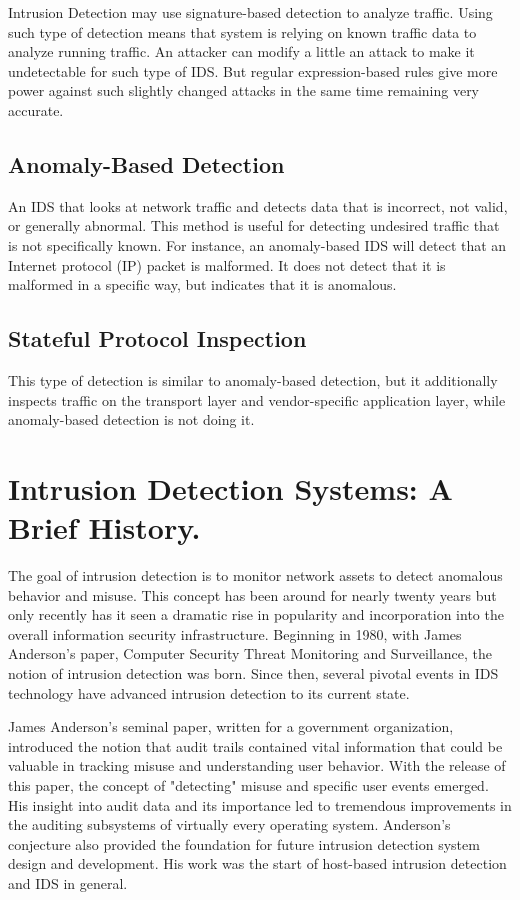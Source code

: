 \documentclass[thesis=M,english]{FITthesis}[2011/07/15]
\begin{document}
Intrusion Detection may use signature-based detection to analyze traffic. Using such type of detection means that system is relying on known traffic data to analyze running traffic. An attacker can modify a little an attack to make it undetectable for such type of IDS. But regular expression-based rules give more power against such slightly changed attacks in the same time remaining very accurate.

\subsection*{Anomaly-Based Detection}
An IDS that looks at network traffic and detects data that is incorrect, not valid, or generally abnormal. This method is useful for detecting undesired traffic that is not specifically known. For instance, an anomaly-based IDS will detect that an Internet protocol (IP) packet is malformed. It does not detect that it is malformed in a specific way, but indicates that it is anomalous.

\subsection*{Stateful Protocol Inspection}
This type of detection is similar to anomaly-based detection, but it additionally inspects traffic on the transport layer and vendor-specific application layer, while anomaly-based detection is not doing it.

\section{Intrusion Detection Systems: A Brief History.}
The goal of intrusion detection is to monitor network assets to detect anomalous behavior and misuse. This concept has been around for nearly twenty years but only recently has it seen a dramatic rise in popularity and incorporation into the overall information security infrastructure. Beginning in 1980, with James Anderson's paper, Computer Security Threat Monitoring and Surveillance, the notion of intrusion detection was born. Since then, several pivotal events in IDS technology have advanced intrusion detection to its current state.

James Anderson's seminal paper, written for a government organization, introduced the notion that audit trails contained vital information that could be valuable in tracking misuse and understanding user behavior. With the release of this paper, the concept of "detecting" misuse and specific user events emerged. His insight into audit data and its importance led to tremendous improvements in the auditing subsystems of virtually every operating system. Anderson's conjecture also provided the foundation for future intrusion detection system design and development. His work was the start of host-based intrusion detection and IDS in general.
\end{document}

